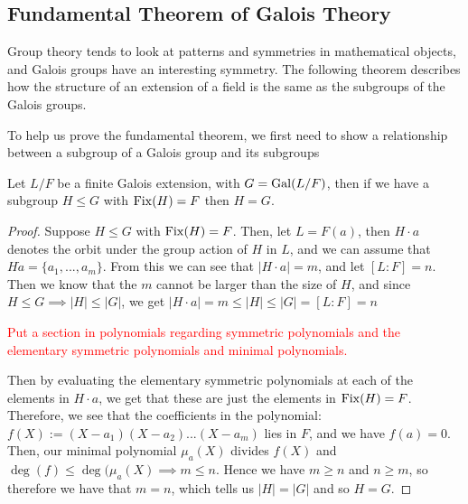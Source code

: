 \TODO

\subsection{Fundamental Theorem of Galois Theory}

%
%
%




Group theory tends to look at patterns and symmetries in mathematical objects, and Galois groups have an interesting symmetry. The following theorem describes how the structure of an extension of a field is the same as the subgroups of the Galois groups.

To help us prove the fundamental theorem, we first need to show a relationship between a subgroup of a Galois group and its subgroups

\begin{theorem}\label{thm:equal-subgroup-fixed-points}
    Let $L/F$ be a finite Galois extension, with $G=\operatorname{Gal}(L/F)$, then if we have a subgroup $H\leq G$ with $\operatorname{Fix}(H)=F$ then $H=G$.
\end{theorem}

\begin{proof}
    Suppose $H\leq G$ with $\operatorname{Fix}(H)=F$. Then, let $L = F(a)$, then $H \cdot a$ denotes the orbit under the group action of $H$ in $L$, and we can assume that $H \dot a = \{a_1,...,a_m\}.$ From this we can see that $|H \cdot a| = m$, and let $[L:F]=n$.
    Then we know that the $m$ cannot be larger than the size of $H$, and since $H\leq G \implies |H|\leq|G|$, we get $|H \cdot a| = m \leq |H| \leq |G| = [L:F] = n$ 
    
    \textcolor{red}{Put a section in polynomials regarding symmetric polynomials and the elementary symmetric polynomials and minimal polynomials.} 
    
    \noindent
    Then by evaluating the elementary symmetric polynomials at each of the elements in $H \cdot a$, we get that these are just the elements in $\operatorname{Fix}(H)=F$. Therefore, we see that the coefficients in the polynomial: $f(X) := (X-a_1)(X-a_2)...(X-a_m)$ lies in $F$, and we have $f(a)=0$. Then, our minimal polynomial $\mu_a(X)$ divides $f(X)$ and $\deg(f) \leq \deg(\mu_a(X) \implies m \leq n$. Hence we have $m \geq n$ and $n \geq m$, so therefore we have that $m=n$, which tells us $|H|=|G|$ and so $H=G.$
\end{proof}

